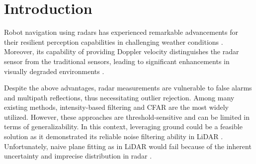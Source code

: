 \section{Introduction}
\label{sec:intro}
Robot navigation using radars has experienced remarkable advancements for their resilient perception capabilities in challenging weather conditions \cite{harlow2023new, abu2024radar, starr2014evaluation, bijelic2018benchmark, kramer2021radar}.
Moreover, its capability of providing Doppler velocity distinguishes the radar sensor from the traditional sensors, leading to significant enhancements in visually degraded environments \cite{nissov2024degradation}.


Despite the above advantages, radar measurements are vulnerable to false alarms and multipath reflections, thus necessitating outlier rejection.
Among many existing methods, intensity-based filtering \cite{adolfsson2023lidar} and \ac{CFAR} are the most widely utilized. However, these approaches are threshold-sensitive and can be limited in terms of generalizability.
In this context, leveraging ground could be a feasible solution as it demonstrated its reliable noise filtering ability in \ac{LiDAR} \cite{shan2018lego, pan2021mulls, zheng2021efficient, chen2021low, wei2022gclo, galeote2023gnd}. Unfortunately, naive plane fitting as in \ac{LiDAR} would fail because of the inherent uncertainty and imprecise distribution in radar \cite{li20234d, chen2023drio}.

